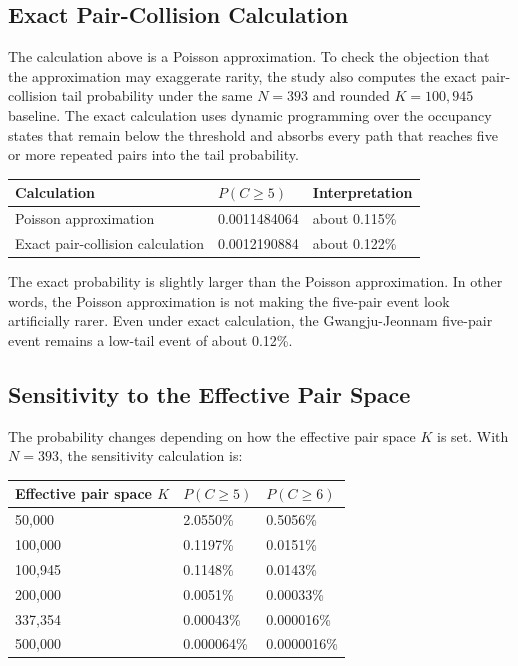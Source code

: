 \documentclass[preprint]{../ieie/IEIE}
\begin{document}
\subsection{Exact Pair-Collision Calculation}

The calculation above is a Poisson approximation. To check the objection that the approximation may exaggerate rarity, the study also computes the exact pair-collision tail probability under the same \(N=393\) and rounded \(K=100,945\) baseline. The exact calculation uses dynamic programming over the occupancy states that remain below the threshold and absorbs every path that reaches five or more repeated pairs into the tail probability.

\begin{center}
\small
\begin{tabular}{l l l}
\toprule
Calculation & \(P(C \geq 5)\) & Interpretation \\
\midrule
Poisson approximation & 0.0011484064 & about 0.115\% \\
Exact pair-collision calculation & 0.0012190884 & about 0.122\% \\
\bottomrule
\end{tabular}
\end{center}

The exact probability is slightly larger than the Poisson approximation. In other words, the Poisson approximation is not making the five-pair event look artificially rarer. Even under exact calculation, the Gwangju-Jeonnam five-pair event remains a low-tail event of about 0.12\%.

\subsection{Sensitivity to the Effective Pair Space}

The probability changes depending on how the effective pair space \(K\) is set. With \(N=393\), the sensitivity calculation is:

\begin{center}
\small
\begin{tabular}{l l l}
\toprule
Effective pair space \(K\) & \(P(C \geq 5)\) & \(P(C \geq 6)\) \\
\midrule
50,000 & 2.0550\% & 0.5056\% \\
100,000 & 0.1197\% & 0.0151\% \\
100,945 & 0.1148\% & 0.0143\% \\
200,000 & 0.0051\% & 0.00033\% \\
337,354 & 0.00043\% & 0.000016\% \\
500,000 & 0.000064\% & 0.0000016\% \\
\bottomrule
\end{tabular}
\end{center}
\end{document}
